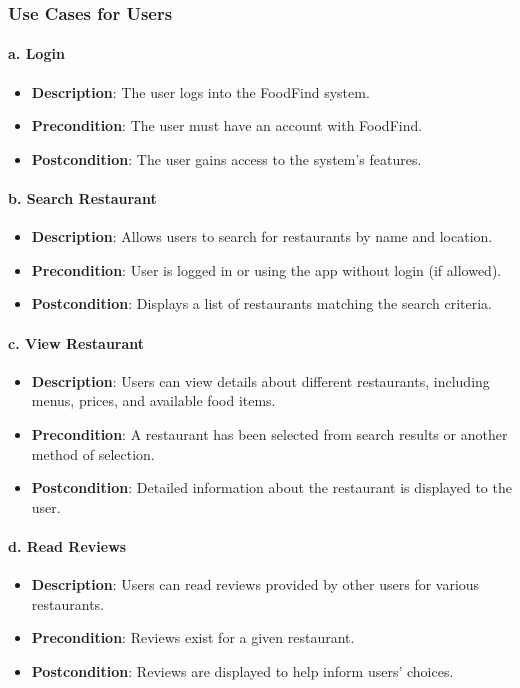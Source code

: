 \documentclass[12pt, a4paper, oneside]{article}
\begin{document}
\subsubsection{Use Cases for Users}

\paragraph{a. Login}
\begin{itemize}
    \item \textbf{Description}: The user logs into the FoodFind system.
    \item \textbf{Precondition}: The user must have an account with FoodFind.
    \item \textbf{Postcondition}: The user gains access to the system’s features.
\end{itemize}

\paragraph{b. Search Restaurant}
\begin{itemize}
    \item \textbf{Description}: Allows users to search for restaurants by name and location.
    \item \textbf{Precondition}: User is logged in or using the app without login (if allowed).
    \item \textbf{Postcondition}: Displays a list of restaurants matching the search criteria.
\end{itemize}

\paragraph{c. View Restaurant}
\begin{itemize}
    \item \textbf{Description}: Users can view details about different restaurants, including menus, prices, and available food items.
    \item \textbf{Precondition}: A restaurant has been selected from search results or another method of selection.
    \item \textbf{Postcondition}: Detailed information about the restaurant is displayed to the user.
\end{itemize}

\paragraph{d. Read Reviews}
\begin{itemize}
    \item \textbf{Description}: Users can read reviews provided by other users for various restaurants.
    \item \textbf{Precondition}: Reviews exist for a given restaurant.
    \item \textbf{Postcondition}: Reviews are displayed to help inform users’ choices.
\end{itemize}
\end{document}
